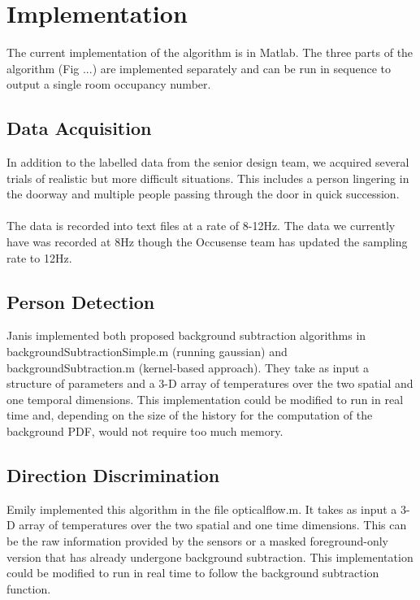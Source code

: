 \documentclass[12pt,oneside]{article} %
\begin{document}
\section{Implementation}  %
The current implementation of the algorithm is in Matlab. The three parts of the algorithm (Fig ...)
are implemented
separately and can be run in sequence to output a single room occupancy number.

\subsection{Data Acquisition}  %
In addition to the labelled data from the senior design team, we acquired several trials of realistic but more
difficult situations. This includes a person lingering in the doorway and multiple people passing through
the door in quick succession.
\\ \\
The data is recorded into text files at a rate of 8-12Hz. The data we currently have was recorded at 8Hz
though the Occusense team has updated the sampling rate to 12Hz.

\subsection{Person Detection}
Janis implemented both proposed background subtraction algorithms in backgroundSubtractionSimple.m 
(running gaussian) and backgroundSubtraction.m (kernel-based approach).
They take as input a structure of parameters
and a 3-D array of temperatures over the two spatial and one temporal dimensions. This implementation could
be modified to run in real time and, depending on the size of the history for the computation of the background
PDF, would not require too much memory.

\subsection{Direction Discrimination}
Emily implemented this algorithm in the file opticalflow.m. It takes as input a 3-D array of temperatures over the two spatial and one time dimensions. This can be the raw information provided by the sensors or a masked foreground-only version that has already undergone background subtraction. This implementation could be modified to run in real time to follow the background subtraction function.
\end{document}
